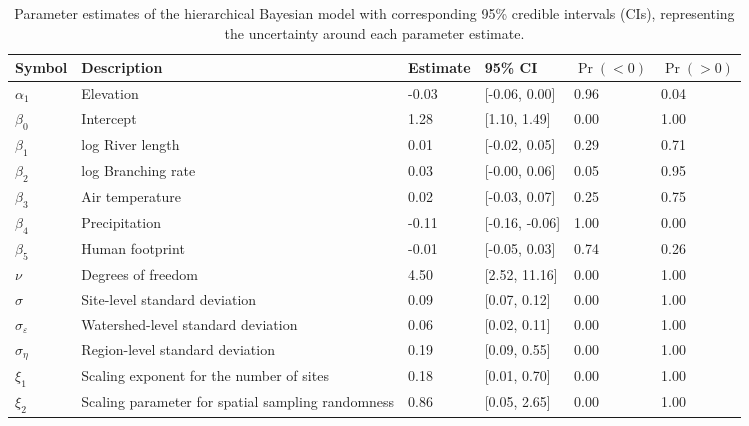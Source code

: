 \begin{table}[ht]
\centering
\caption{Parameter estimates of the hierarchical Bayesian model 
             with corresponding 95\% credible intervals (CIs), 
             representing the uncertainty around each parameter estimate.
             \label{tab:parms-est}} 
\begingroup\small
\begin{tabularx}{\textwidth}{llllll}
  \hline
Symbol & Description & Estimate & 95\% CI & $\Pr(< 0)$ & $\Pr(> 0)$ \\ 
  \hline
$\alpha_1$ & Elevation & -0.03 & [-0.06, 0.00] & 0.96 & 0.04 \\ 
  $\beta_0$ & Intercept & 1.28 & [1.10, 1.49] & 0.00 & 1.00 \\ 
  $\beta_1$ & log River length & 0.01 & [-0.02, 0.05] & 0.29 & 0.71 \\ 
  $\beta_2$ & log Branching rate & 0.03 & [-0.00, 0.06] & 0.05 & 0.95 \\ 
  $\beta_3$ & Air temperature & 0.02 & [-0.03, 0.07] & 0.25 & 0.75 \\ 
  $\beta_4$ & Precipitation & -0.11 & [-0.16, -0.06] & 1.00 & 0.00 \\ 
  $\beta_5$ & Human footprint & -0.01 & [-0.05, 0.03] & 0.74 & 0.26 \\ 
  $\nu$ & Degrees of freedom & 4.50 & [2.52, 11.16] & 0.00 & 1.00 \\ 
  $\sigma$ & Site-level standard deviation & 0.09 & [0.07, 0.12] & 0.00 & 1.00 \\ 
  $\sigma_{\varepsilon}$ & Watershed-level standard deviation & 0.06 & [0.02, 0.11] & 0.00 & 1.00 \\ 
  $\sigma_{\eta}$ & Region-level standard deviation & 0.19 & [0.09, 0.55] & 0.00 & 1.00 \\ 
  $\xi_{1}$ & Scaling exponent for the number of sites & 0.18 & [0.01, 0.70] & 0.00 & 1.00 \\ 
  $\xi_{2}$ & Scaling parameter for spatial sampling randomness & 0.86 & [0.05, 2.65] & 0.00 & 1.00 \\ 
   \hline
\end{tabularx}
\endgroup
\end{table}
